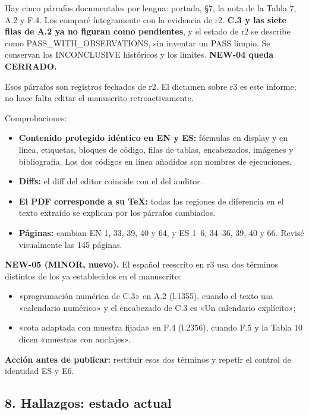 \documentclass[
]{article}
\providecommand{\tightlist}{%
  \setlength{\itemsep}{0pt}\setlength{\parskip}{0pt}}
\begin{document}
Hay cinco párrafos documentales por lengua: portada, §7, la nota de la
Tabla 7, A.2 y F.4. Los comparé íntegramente con la evidencia de r2.
\textbf{C.3 y las siete filas de A.2 ya no figuran como pendientes}, y
el estado de r2 se describe como PASS\_WITH\_OBSERVATIONS, sin inventar
un PASS limpio. Se conservan los INCONCLUSIVE históricos y los límites.
\textbf{NEW-04 queda CERRADO.}

Esos párrafos son registros fechados de r2. El dictamen sobre r3 es este
informe; no hace falta editar el manuscrito retroactivamente.

Comprobaciones:

\begin{itemize}
\tightlist
\item
  \textbf{Contenido protegido idéntico en EN y ES:} fórmulas en display
  y en línea, etiquetas, bloques de código, filas de tablas,
  encabezados, imágenes y bibliografía. Los dos códigos en línea
  añadidos son nombres de ejecuciones.
\item
  \textbf{Diffs:} el diff del editor coincide con el del auditor.
\item
  \textbf{El PDF corresponde a su TeX:} todas las regiones de diferencia
  en el texto extraído se explican por los párrafos cambiados.
\item
  \textbf{Páginas:} cambian EN 1, 33, 39, 40 y 64, y ES 1--6, 34--36,
  39, 40 y 66. Revisé visualmente las 145 páginas.
\end{itemize}

\textbf{NEW-05 (MINOR, nuevo).} El español reescrito en r3 usa dos
términos distintos de los ya establecidos en el manuscrito:

\begin{itemize}
\tightlist
\item
  «programación numérica de C.3» en A.2 (l.1355), cuando el texto usa
  «calendario numérico» y el encabezado de C.3 es «Un calendario
  explícito»;
\item
  «cota adaptada con muestra fijada» en F.4 (l.2356), cuando F.5 y la
  Tabla 10 dicen «muestras con anclajes».
\end{itemize}

\textbf{Acción antes de publicar:} restituir esos dos términos y repetir
el control de identidad ES y E6.

\subsection{8. Hallazgos: estado
actual}\label{8-hallazgos-estado-actual}
\end{document}

